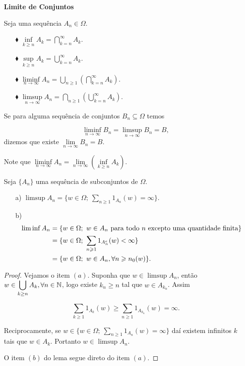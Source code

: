 \vspace*{1cm}
\textbf{Limite de Conjuntos}

Seja uma sequência $A_n \in \Omega$.
\begin{enumerate}
\item[$\blacklozenge$] $\inf \limits_{k\geqslant n} A_k = \displaystyle\bigcap_{k=n}^{\infty}{A_k}$.
\item[$\blacklozenge$] $\sup \limits_{k\geqslant n} A_k = \displaystyle\bigcup_{k=n}^{\infty}{A_k}$.
\item[$\blacklozenge$] 
	$\liminf \limits_{n \to \infty} A_n 
	= 
	\displaystyle\bigcup_ {n\geqslant 1} \left(\displaystyle\bigcap_{k=n}^{\infty}{A_k} \right)$.
\item[$\blacklozenge$] 
	$\limsup \limits_{n \to \infty} A_n 
	= 
	\displaystyle\bigcap_ {n\geqslant 1} \left(\displaystyle\bigcup_{k=n}^{\infty}{A_k} \right)$.
\end{enumerate}

\begin{definicao}
	Se para alguma sequência de conjuntos $B_n \subseteq \Omega$ temos

	$$
		\liminf \limits_{n \to \infty} B_n = \limsup \limits_{n \to \infty} B_n = B,
	$$	
	dizemos que existe $\lim \limits_{n \to \infty} B_n =B$.
\end{definicao}

Note que $\liminf \limits_{n\to \infty}A_n 
			=
			\lim \limits_{n\to \infty}\left(\inf \limits_{k\geqslant n}A_k \right)
		 $.


\begin{lema}
Seja $\{A_n\}$ uma sequência de subconjuntos de $\Omega$.
\begin{enumerate}
\item[a)] $\limsup A_n = \{ w \in \Omega;\ \sum_{n \geqslant 1} 1_{A_n}(w)= \infty \}$.
\item[b)] 
\begin{align*}
\vspace*{-2cm}
\liminf A_n & = \{ w \in \Omega;\ w \in A_n \text{ para todo $n$ excepto uma quantidade finita} \} \\
			& = \{w \in \Omega;\ \sum_{n\geqslant 1} 1_{A_n^c}(w) < \infty \} \\
			& = \{w \in \Omega;\ w \in A_n, \forall n \geqslant n_0(w) \}. 
\end{align*} 
\end{enumerate}
\end{lema}

\begin{proof}
Vejamos o item $(a)$. Suponha que $w \in \limsup A_n$, então $w \in \displaystyle\bigcup_{k \geq n} A_k,
\forall n \in \mathbb{N}$, logo existe $k_n \geqslant n$ tal que $w \in A_{k_n}$. Assim

	$$
		\sum \limits_{k \geqslant 1} 1_{A_k}(w) \geqslant \sum \limits_{n\geqslant 1} 1_{A_{k_n}}(w) 
		= 
		\infty.
	$$

Reciprocamente, se $ w \in \{ w \in \Omega;\ \sum_{n \geqslant 1} 1_{A_n}(w)= \infty \}$ daí existem 
infinitos $k$ tais que $w \in A_k$. Portanto $w \in \limsup A_n$.

O item $(b)$ do lema segue direto do item $(a)$. 
\end{proof}

